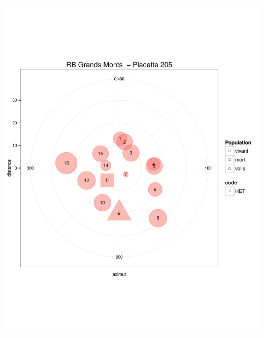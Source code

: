 \documentclass[a4paper]{book}\usepackage[]{graphicx}\usepackage[]{color}
\makeatletter
\def\maxwidth{ %
  \ifdim\Gin@nat@width>\linewidth
    \linewidth
  \else
    \Gin@nat@width
  \fi
}
\newenvironment{knitrout}{}{} %
\makeatother
\begin{document}
\begin{knitrout}
{\centering \includegraphics[width=\maxwidth]{Figures/PlanArbres-18} 

}





\end{knitrout}
\end{document}
